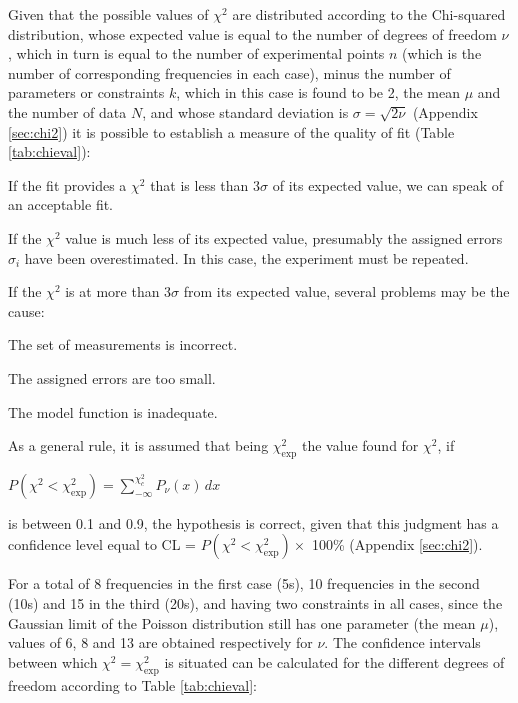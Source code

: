 Given that the possible values of $\chi^2$ are distributed according to the Chi-squared distribution, whose expected value is equal to the number of degrees of freedom $\nu$, which in turn is equal to the number of experimental points $n$ (which is the number of corresponding frequencies in each case), minus the number of parameters or constraints $k$, which in this case is found to be 2, the mean $\mu$ and the number of data $N$, and whose standard deviation is $\sigma = \sqrt{2\nu}$
(Appendix \ref{sec:chi2}) it is possible to establish a measure of the quality of fit (Table \ref{tab:chieval}):


	\ben
		\item If the fit provides a $\chi^2$ that is less than 3$\sigma$ of its expected value, we can speak of an acceptable fit.

		\item If the $\chi^2$ value is much less of its expected value, presumably the assigned errors $\sigma_i$ have been overestimated. In this case, the experiment must be repeated.

		\item If the $\chi^2$ is at more than 3$\sigma$ from its expected value, several problems may be the cause:
			\bi 
				\item The set of measurements is incorrect.
				\item The assigned errors are too small.
				\item The model function is inadequate.
			\ei
	\een

As a general rule, it is assumed that being $\chi_\text{exp}^2$ the value found for $\chi^2$, if

	\bc $P \left(\chi^2 < \chi_\text{exp}^2\right) = \sum_{-\infty}^{\chi_c^2} P_\nu(x) \,dx$\ec

is between 0.1 and 0.9, the hypothesis is correct, given that this judgment has a confidence level equal to CL = $P \left(\chi^2 < \chi_\text{exp}^2\right) \times$ 100\% (Appendix \ref{sec:chi2}).

For a total of 8 frequencies in the first case (5s), 10 frequencies in the second (10s) and 15 in the third (20s), and having two constraints in all cases, since the Gaussian limit of the Poisson distribution still has one parameter (the mean $\mu$), values of 6, 8 and 13 are obtained respectively for $\nu$. The confidence intervals between which $\chi^2 = \chi_\text{exp}^2$ is situated can be calculated for the different degrees of freedom according to Table \ref{tab:chieval}:

